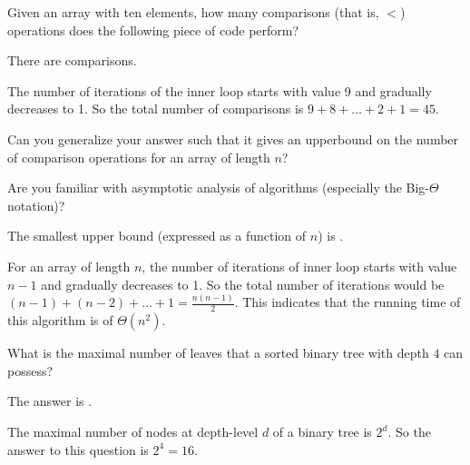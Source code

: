 \documentclass{ximera}
\begin{document}
\begin{question}
Given an array with ten elements, how many comparisons (that is, $<$)
operations does the following piece of code perform?
\begin{solution}
There are  comparisons.
\end{solution}  
The number of iterations of the inner loop starts with value 9 and
gradually decreases to 1. So the total number of comparisons is $ 9 +
8 + \ldots + 2 + 1 = 45$.
\end{question}

\begin{question}
Can you generalize your answer such that it gives an upperbound on the
number of comparison operations for an array of length $n$?
\begin{solution}
\begin{hint}
Are you familiar with asymptotic analysis of algorithms (especially
the Big-$\Theta$ notation)?
\end{hint}
The smallest upper bound (expressed as a function of $n$) is
.
\end{solution}
For an array of length $n$, the number of iterations of inner loop
starts with value $n-1$ and gradually decreases to 1. So the total
number of iterations would be $(n-1) + (n-2) + \ldots + 1 =
\frac{n(n-1)}{2}$. This indicates that the running time of this
algorithm is of $\Theta(n^2)$.
\end{question}


\begin{question}
What is the maximal number of leaves that a sorted binary tree with depth $4$ can possess?
\begin{solution}
The answer is .
\end{solution}
The maximal number of nodes at depth-level $d$ of a binary tree is $2^d$. So the answer to this question is $2^4 = 16$. 
\end{question}
\end{document}
